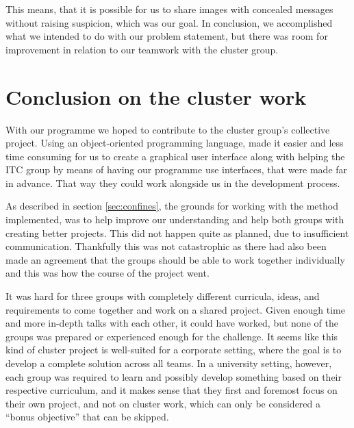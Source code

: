 This means, that it is possible for us to share images with concealed messages without raising suspicion, which was our goal.
In conclusion, we accomplished what we intended to do with our problem statement, but there was room for improvement in relation to our teamwork with the cluster group.

\section{Conclusion on the cluster work}

With our programme we hoped to contribute to the cluster group's collective project.
Using an object-oriented programming language, made it easier and less time consuming for us to create a graphical user interface along with helping the ITC group by means of having our programme use interfaces, that were made far in advance. That way they could work alongside us in the development process.

As described in section \ref{sec:confines}, the grounds for working with the method implemented, was to help improve our understanding and help both groups with creating better projects. 
This did not happen quite as planned, due to insufficient communication.
Thankfully this was not catastrophic as there had also been made an agreement that the groups should be able to work together individually and this was how the course of the project went.

It was hard for three groups with completely different curricula, ideas, and requirements to come together and work on a shared project.
Given enough time and more in-depth talks with each other, it could have worked, but none of the groups was prepared or experienced enough for the challenge.
It seems like this kind of cluster project is well-suited for a corporate setting, where the goal is to develop a complete solution across all teams.
In a university setting, however, each group was required to learn and possibly develop something based on their respective curriculum, and it makes sense that they first and foremost focus on their own project, and not on cluster work, which can only be considered a ``bonus objective'' that can be skipped.

